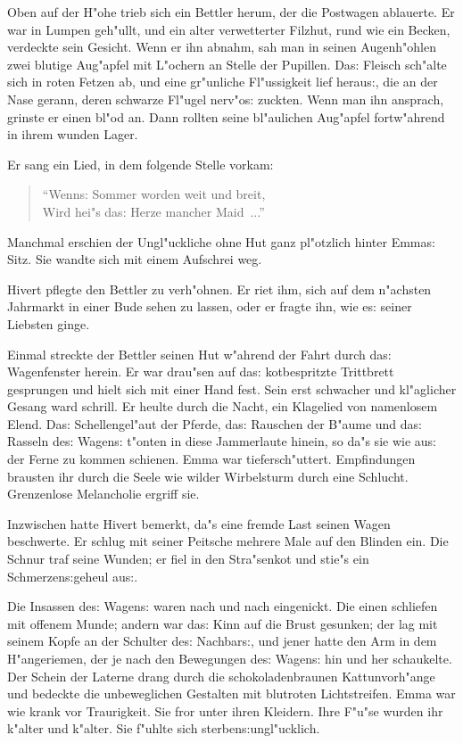 \documentclass[oneside,12pt]{book}
\newcommand{\s}{s:}%
\begin{document}
Oben auf der H"ohe trieb sich ein Bettler herum, der die Postwagen
ablauerte. Er war in Lumpen geh"ullt, und ein alter verwetterter
Filzhut, rund wie ein Becken, verdeckte sein Gesicht. Wenn er ihn
abnahm, sah man in seinen Augenh"ohlen zwei blutige Aug"apfel mit
L"ochern an Stelle der Pupillen. Da{\s} Fleisch sch"alte sich in
roten Fetzen ab, und eine gr"unliche Fl"ussigkeit lief herau{\s},
die an der Nase gerann, deren schwarze Fl"ugel nerv"o{\s} zuckten.
Wenn man ihn ansprach, grinste er einen bl"od an. Dann rollten
seine bl"aulichen Aug"apfel fortw"ahrend in ihrem wunden Lager.

Er sang ein Lied, in dem folgende Stelle vorkam:
\begin{verse}
"`Wenn{\s} Sommer worden weit und breit, \\
Wird hei"s da{\s} Herze mancher Maid~..."'
\end{verse}

Manchmal erschien der Ungl"uckliche ohne Hut ganz pl"otzlich
hinter Emma{\s} Sitz. Sie wandte sich mit einem Aufschrei weg.

Hivert pflegte den Bettler zu verh"ohnen. Er riet ihm, sich auf
dem n"achsten Jahrmarkt in einer Bude sehen zu lassen, oder er
fragte ihn, wie e{\s} seiner Liebsten ginge.

Einmal streckte der Bettler seinen Hut w"ahrend der Fahrt durch
da{\s} Wagenfenster herein. Er war drau"sen auf da{\s}
kotbespritzte Trittbrett gesprungen und hielt sich mit einer Hand
fest. Sein erst schwacher und kl"aglicher Gesang ward schrill. Er
heulte durch die Nacht, ein Klagelied von namenlosem Elend. Da{\s}
Schellengel"aut der Pferde, da{\s} Rauschen der B"aume und da{\s}
Rasseln de{\s} Wagen{\s} t"onten in diese Jammerlaute hinein, so
da"s sie wie au{\s} der Ferne zu kommen schienen. Emma war
tiefersch"uttert. Empfindungen brausten ihr durch die Seele wie
wilder Wirbelsturm durch eine Schlucht. Grenzenlose Melancholie
ergriff sie.

Inzwischen hatte Hivert bemerkt, da"s eine fremde Last seinen
Wagen beschwerte. Er schlug mit seiner Peitsche mehrere Male auf
den Blinden ein. Die Schnur traf seine Wunden; er fiel in den
Stra"senkot und stie"s ein Schmerzen{\s}geheul au{\s}.

Die Insassen de{\s} Wagen{\s} waren nach und nach eingenickt. Die
einen schliefen mit offenem Munde; andern war da{\s} Kinn auf die
Brust gesunken; der lag mit seinem Kopfe an der Schulter de{\s}
Nachbar{\s}, und jener hatte den Arm in dem H"angeriemen, der je
nach den Bewegungen de{\s} Wagen{\s} hin und her schaukelte. Der
Schein der Laterne drang durch die schokoladenbraunen
Kattunvorh"ange und bedeckte die unbeweglichen Gestalten mit
blutroten Lichtstreifen. Emma war wie krank vor Traurigkeit. Sie
fror unter ihren Kleidern. Ihre F"u"se wurden ihr k"alter und
k"alter. Sie f"uhlte sich sterben{\s}ungl"ucklich.
\end{document}
